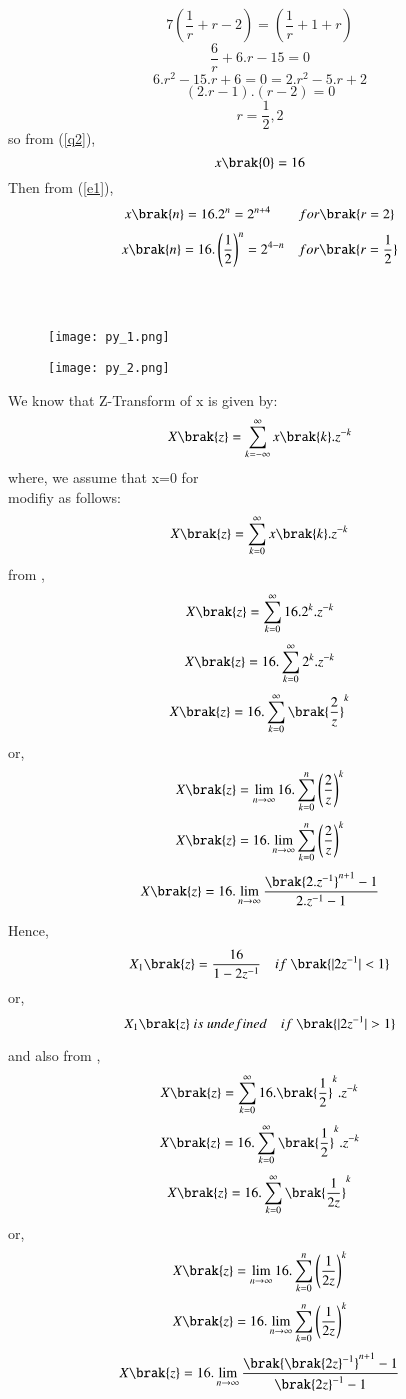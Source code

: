\documentclass[beamer]{IEEEtran}
\theoremstyle{remark}
\begin{document}
\[7\left(\frac{1}{r}+r-2\right)=\left(\frac{1}{r}+1+r\right)\]
\[\frac{6}{r}+6.r-15=0\]
\[6.r^2-15.r+6=0=2.r^2-5.r+2\]
\[(2.r-1).(r-2)=0\]
\begin{equation}
\label{q3}
r=\frac{1}{2},2
\end{equation}
so from (\ref{q2}),
\[x\brak{0}=16\]
Then from (\ref{e1}),
\begin{align}
    \label{a11}
    x\brak{n}=16.2^{n}=2^{n+4}\qquad for \brak{r=2}
\end{align}
\begin{align}
    \label{a12}
    x\brak{n}=16.\left(\frac{1}{2}\right)^{n}=2^{4-n}\quad for \brak{r=\frac{1}{2}}
\end{align}\\\\

\begin{figure}[h]
    \centering
    \texttt{[image: py\_1.png]}
    \label{fig:enter-label}
\end{figure}

\begin{figure}[h]
    \centering
    \texttt{[image: py\_2.png]}
    \label{fig:enter-label}
\end{figure}

We know that Z-Transform of x is given by:
\begin{align}
\label{a13}
    X\brak{z}=\sum_{k=-\infty}^{\infty} x\brak{k}.z^{-k}
\end{align}
where, we assume that x=0   for \\
\brak{\ref{a13}} modifiy as follows:
\begin{align}
\label{a14}
    X\brak{z}=\sum_{k=0}^{\infty} x\brak{k}.z^{-k}
\end{align}
from \brak{\ref{a11}},
$$X\brak{z}=\sum_{k=0}^{\infty} 16.2^k.z^{-k}$$
$$X\brak{z}=16.\sum_{k=0}^{\infty} 2^k.z^{-k}$$
$$X\brak{z}=16.\sum_{k=0}^{\infty} \brak{\frac{2}{z}}^k$$
or,
$$X\brak{z}=\lim_{n\to\infty}16.\sum_{k=0}^{n} \left(\frac{2}{z}\right)^k$$
$$X\brak{z}=16.\lim_{n\to\infty}\sum_{k=0}^{n}
\left(\frac{2}{z}\right)^k$$
$$X\brak{z}=16.\lim_{n\to\infty} \frac{\brak{2.z^{-1}}^{n+1}-1}{2.z^{-1}-1}$$

Hence,
$$X_1\brak{z}=\frac{16}{1-2z^{-1}}\quad if\ \brak{|2z^{-1}|<1}$$
or,
$$X_1\brak{z}\ is\ undefined\quad if\ \brak{|2z^{-1}|>1}$$

and also from \brak{\ref{a12}},
$$X\brak{z}=\sum_{k=0}^{\infty} 16.\brak{\frac{1}{2}}^k.z^{-k}$$
$$X\brak{z}=16.\sum_{k=0}^{\infty} \brak{\frac{1}{2}}^k.z^{-k}$$
$$X\brak{z}=16.\sum_{k=0}^{\infty} \brak{\frac{1}{2z}}^k$$
or,
$$X\brak{z}=\lim_{n\to\infty}16.\sum_{k=0}^{n} \left(\frac{1}{2z}\right)^k$$
$$X\brak{z}=16.\lim_{n\to\infty}\sum_{k=0}^{n}
\left(\frac{1}{2z}\right)^k$$
$$X\brak{z}=16.\lim_{n\to\infty} \frac{\brak{\brak{2z}^{-1}}^{n+1}-1}{{\brak{2z}^{-1}}-1}$$
\end{document}
